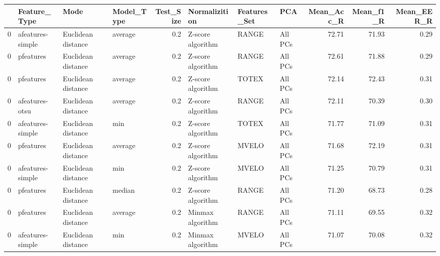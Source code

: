 \begin{tabular}{llllrlllrrr}
\toprule
{} &      Feature\_Type &                Mode & Model\_Type &  Test\_Size &      Normalizition & Features\_Set &      PCA &  Mean\_Acc\_R &  Mean\_f1\_R &  Mean\_EER\_R \\
\midrule
0 &  afeatures-simple &  Euclidean distance &    average &        0.2 &  Z-score algorithm &        RANGE &  All PCs &       72.71 &      71.93 &        0.29 \\
0 &         pfeatures &  Euclidean distance &    average &        0.2 &  Z-score algorithm &        RANGE &  All PCs &       72.61 &      71.88 &        0.29 \\
0 &         pfeatures &  Euclidean distance &    average &        0.2 &  Z-score algorithm &        TOTEX &  All PCs &       72.14 &      72.43 &        0.31 \\
0 &    afeatures-otsu &  Euclidean distance &    average &        0.2 &  Z-score algorithm &        RANGE &  All PCs &       72.11 &      70.39 &        0.30 \\
0 &  afeatures-simple &  Euclidean distance &        min &        0.2 &  Z-score algorithm &        TOTEX &  All PCs &       71.77 &      71.09 &        0.31 \\
0 &         pfeatures &  Euclidean distance &    average &        0.2 &  Z-score algorithm &        MVELO &  All PCs &       71.68 &      72.19 &        0.31 \\
0 &  afeatures-simple &  Euclidean distance &        min &        0.2 &  Z-score algorithm &        MVELO &  All PCs &       71.25 &      70.79 &        0.31 \\
0 &         pfeatures &  Euclidean distance &     median &        0.2 &  Z-score algorithm &        RANGE &  All PCs &       71.20 &      68.73 &        0.28 \\
0 &         pfeatures &  Euclidean distance &    average &        0.2 &   Minmax algorithm &        RANGE &  All PCs &       71.11 &      69.55 &        0.32 \\
0 &  afeatures-simple &  Euclidean distance &        min &        0.2 &   Minmax algorithm &        MVELO &  All PCs &       71.07 &      70.08 &        0.32 \\
\bottomrule
\end{tabular}
